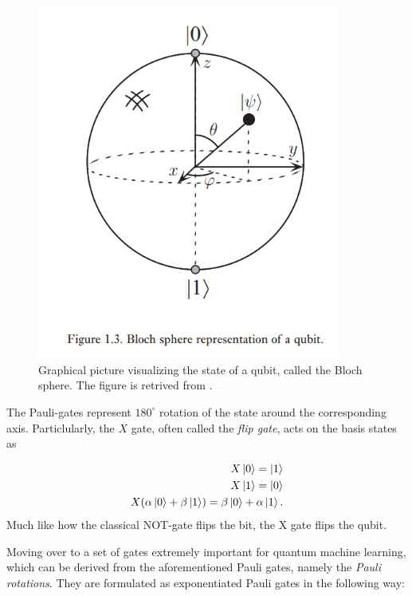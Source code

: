 \begin{figure}[htp]
    \centering
    \includegraphics[width=10cm]{latex/figures/Blochsphere.PNG}
    \caption{Graphical picture visualizing the state of a qubit, called the Bloch sphere. The figure is retrived from \cite{NielsenQuantum}.}
    \label{fig:blochsphere}
\end{figure}

The Pauli-gates represent $180^{\circ}$ rotation of the state around the corresponding axis. Particlularly, the $X$ gate, often called the \emph{flip gate}, acts on the basis states as

\begin{equation}
\begin{aligned}
    X\ket{0} = \ket{1} \\
    X\ket{1} = \ket{0} \\
    X(\alpha \ket{0} + \beta\ket{1}) = \beta \ket{0} + \alpha\ket{1}.
\end{aligned}    
\end{equation}
Much like how the classical NOT-gate flips the bit, the X gate flips the qubit.

Moving over to a set of gates extremely important for quantum machine learning, which can be derived from the aforementioned Pauli gates, namely the \emph{Pauli rotations}. They are formulated as exponentiated Pauli gates in the following way:

